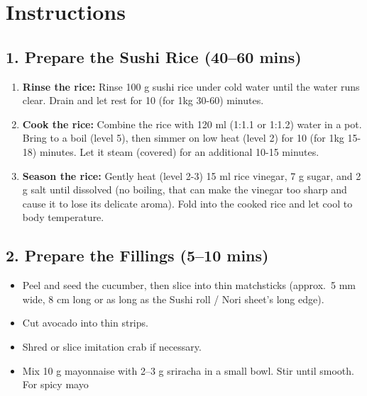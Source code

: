 \documentclass[landscape, a4paper]{article}
\newcommand\alert[1]{\textcolor{PrimaryColor}{\textbf{#1}}}
\begin{document}
\begin{minipage}[t]{0.31\textwidth}
	\vspace{0.5cm}
	\setlength{\parskip}{0.25cm}

	\section*{Instructions}
	\vspace{0.25cm}

	\subsection*{1. Prepare the Sushi Rice (40–60 mins)}
	\vspace{0.25cm}
	\begin{enumerate}
		\item \alert{Rinse the rice:} Rinse 100 g sushi rice under cold water until the water runs clear. Drain and let rest for 10 (for 1kg 30-60) minutes.
		\item \alert{Cook the rice:} Combine the rice with 120 ml (1:1.1 or 1:1.2) water in a pot. Bring to a boil (level 5), then simmer on low heat (level 2) for 10 (for 1kg 15-18) minutes. Let it steam (covered) for an additional 10-15 minutes.
		\item \alert{Season the rice:} Gently heat (level 2-3) 15 ml rice vinegar, 7 g sugar, and 2 g salt until dissolved (no boiling, that can make the vinegar too sharp and cause it to lose its delicate aroma). Fold into the cooked rice and let cool to body temperature.
	\end{enumerate}

	\subsection*{2. Prepare the Fillings (5–10 mins)}
	\begin{itemize}
		\item Peel and seed the cucumber, then slice into thin matchsticks (approx.\ 5 mm wide, 8 cm long or as long as the Sushi roll / Nori sheet's long edge).
		\item Cut avocado into thin strips.
		\item Shred or slice imitation crab if necessary.
		\item Mix 10 g mayonnaise with 2–3 g sriracha in a small bowl. Stir until smooth. For spicy mayo
	\end{itemize}


\end{minipage}
\end{document}
